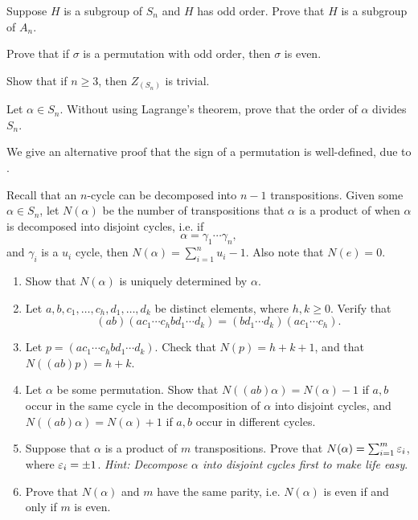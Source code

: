\documentclass[./main.tex]{subfiles}
\begin{document}
\begin{exercise}
    Suppose $H$ is a subgroup of $S_n$ and $H$ has odd order. Prove that $H$ is
    a subgroup of $A_n$.
\end{exercise}

\begin{exercise}
    Prove that if $\sigma$ is a permutation with odd order, then $\sigma$ is
    even.
\end{exercise}

\begin{exercise}
    Show that if $n \geq 3$, then $Z_(S_n)$ is trivial. 
\end{exercise}

\begin{exercise}
    Let $\alpha \in S_n$. Without using Lagrange's theorem, prove that the order
    of $\alpha$ divides $S_n$. 
\end{exercise}

\begin{exercise}
\label{ex:jacobson-permutation-sign}
    We give an alternative proof that the sign of a permutation is well-defined,
    due to \autocite[\pno~50]{Jacobson_2009}.

    Recall that an $n$-cycle can be decomposed into $n-1$ transpositions. Given
    some $\alpha \in S_n$, let $N(\alpha)$ be the number of transpositions that
    $\alpha$ is a product of when $\alpha$ is decomposed into disjoint cycles, i.e. 
    if 
    \[
        \alpha = \gamma_1 \cdots \gamma_n,
    \]
    and $\gamma_i$ is a $u_i$ cycle, then $N(\alpha) = \sum_{i=1}^n u_i - 1$.
    Also note that $N(e) = 0$.
    \begin{enumerate}[label=(\alph*)]
        \item Show that $N(\alpha)$ is uniquely determined by $\alpha$. 
        \item Let $a, b, c_1, \dots, c_h, d_1, \dots, d_k$ be distinct elements,
        where $h, k \geq 0$. Verify that 
        \[
            (ab)(ac_1 \cdots c_h b d_1 \cdots d_k) = (bd_1 \cdots d_k)(ac_1 \cdots c_h).
        \]
        \item Let $p = (ac_1 \cdots c_h b d_1 \cdots d_k)$. Check that $N(p) = h
        + k + 1$, and that $N((ab)p) = h + k$. 
        \item Let $\alpha$ be some permutation. Show that $N((ab) \alpha) =
        N(\alpha) - 1$ if $a, b$ occur in the same cycle in the decomposition of
        $\alpha$ into disjoint cycles, and $N((ab)\alpha) = N(\alpha) + 1$ if
        $a, b$ occur in different cycles. 
        \item Suppose that $\alpha$ is a product of $m$ transpositions. Prove
        that $N(\alpha) = \sum_{i=1}^m \varepsilon_i$, where $\varepsilon_i = \pm 1$.
        \textit{Hint: Decompose $\alpha$ into disjoint cycles first to make life
        easy}.
        \item Prove that $N(\alpha)$ and $m$ have the same parity, i.e.
        $N(\alpha)$ is even if and only if $m$ is even.
    \end{enumerate}
\end{exercise}
\end{document}
